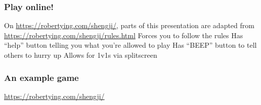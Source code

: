 \documentclass{beamer}
\begin{document}
\begin{frame}
	\frametitle{Play online!}
	\begin{itemize}
		\ii On \url{https://robertying.com/shengji/}, parts of this presentation are adapted from \url{https://robertying.com/shengji/rules.html}
		\ii Forces you to follow the rules
		\ii Has ``help'' button telling you what you're allowed to play
		\ii Has ``BEEP'' button to tell others to hurry up
		\ii Allows for 1v1s via splitscreen
	\end{itemize}

\end{frame}

\begin{frame}
	\frametitle{An example game}
	\url{https://robertying.com/shengji/}
\end{frame}
\end{document}
